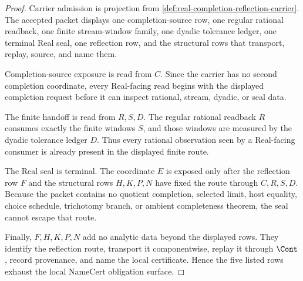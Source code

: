 \begin{proof}
Carrier admission is projection from \autoref{def:real-completion-reflection-carrier}. The accepted packet displays one completion-source row, one regular rational readback, one finite stream-window family, one dyadic tolerance ledger, one terminal Real seal, one reflection row, and the structural rows that transport, replay, source, and name them.

Completion-source exposure is read from $C$. Since the carrier has no second completion coordinate, every Real-facing read begins with the displayed completion request before it can inspect rational, stream, dyadic, or seal data.

The finite handoff is read from $R,S,D$. The regular rational readback $R$ consumes exactly the finite windows $S$, and those windows are measured by the dyadic tolerance ledger $D$. Thus every rational observation seen by a Real-facing consumer is already present in the displayed finite route.

The Real seal is terminal. The coordinate $E$ is exposed only after the reflection row $F$ and the structural rows $H,K,P,N$ have fixed the route through $C,R,S,D$. Because the packet contains no quotient completion, selected limit, host equality, choice schedule, trichotomy branch, or ambient completeness theorem, the seal cannot escape that route.

Finally, $F,H,K,P,N$ add no analytic data beyond the displayed rows. They identify the reflection route, transport it componentwise, replay it through $\Cont$, record provenance, and name the local certificate. Hence the five listed rows exhaust the local NameCert obligation surface.
\end{proof}

